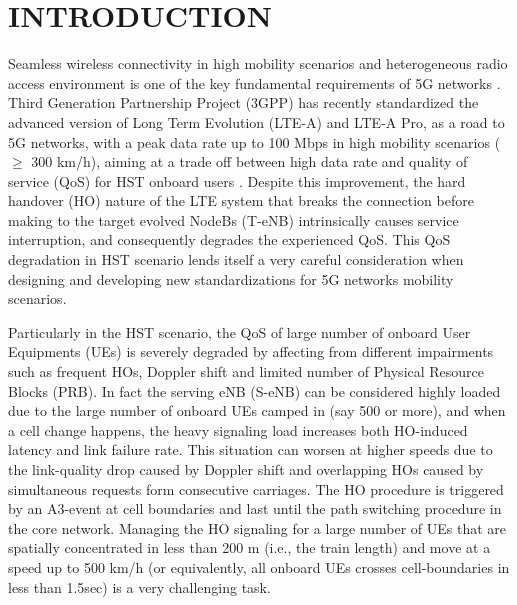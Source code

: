 \documentclass[journal]{IEEEtran}
\begin{document}
{


\IEEEpubidadjcol 

\section{INTRODUCTION}

Seamless wireless connectivity in high mobility scenarios and heterogeneous radio access environment is one of the key fundamental requirements of 5G networks \cite{5G_White_Paper_2016}. Third Generation Partnership Project (3GPP) has recently standardized the advanced version of Long Term Evolution (LTE-A) and LTE-A Pro, as a road to 5G networks, with a peak data rate up to 100 Mbps in high mobility scenarios ($\geq$ 300 km/h), aiming at a trade off between high data rate and quality of service (QoS) for HST onboard users \cite{Sesia_2009}. Despite this improvement, the hard handover (HO) nature of the LTE system that breaks the connection before making to the target evolved NodeBs (T-eNB) intrinsically causes service interruption, and consequently degrades the experienced QoS. This QoS degradation in HST scenario lends itself a very careful consideration when designing and developing new standardizations for 5G networks mobility scenarios. 

Particularly in the HST scenario, the QoS of large number of onboard User Equipments (UEs) is severely degraded by affecting from different impairments such as frequent HOs, Doppler shift and limited number of Physical Resource Blocks (PRB). In fact the serving eNB (S-eNB) can be considered highly loaded due to the large number of onboard UEs camped in (say 500 or more), and when a cell change happens, the heavy signaling load increases both HO-induced latency and link failure rate. This situation can worsen at higher speeds due to the link-quality drop caused by Doppler shift and overlapping HOs caused by simultaneous requests form consecutive carriages. The HO procedure is triggered by an A3-event at cell boundaries and last until the path switching procedure in the core network. Managing the HO signaling for a large number of UEs that are spatially concentrated in less than 200 m (i.e., the train length) and move at a speed up to 500 km/h (or equivalently, all onboard UEs crosses cell-boundaries in less than 1.5sec) is a very challenging task.

}
\end{document}
